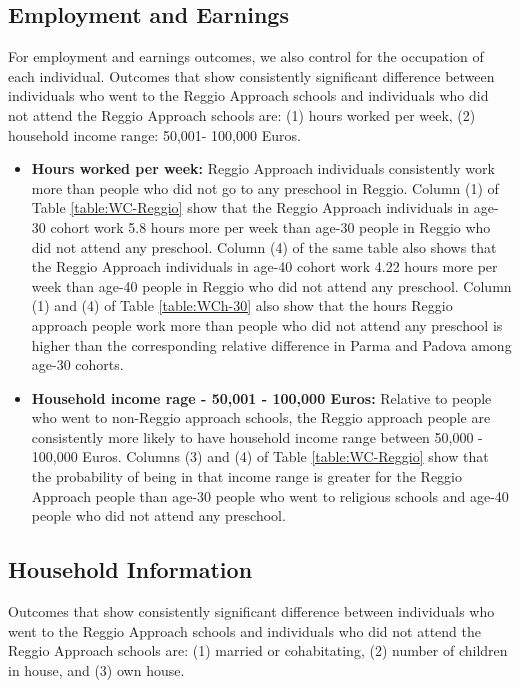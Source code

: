 \documentclass[11pt]{article}
\begin{document}
\subsection{Employment and Earnings}
For employment and earnings outcomes, we also control for the occupation of each individual. Outcomes that show consistently significant difference between individuals who went to the Reggio Approach schools and individuals who did not attend the Reggio Approach schools are: (1) hours worked per week, (2) household income range: 50,001- 100,000 Euros.

\begin{itemize}
\item \textbf{Hours worked per week:} Reggio Approach individuals consistently work more than people who did not go to any preschool in Reggio. Column (1) of Table \ref{table:WC-Reggio} show that the Reggio Approach individuals in age-30 cohort work 5.8 hours more per week than age-30 people in Reggio who did not attend any preschool. Column (4) of the same table also shows that the Reggio Approach individuals in age-40 cohort work 4.22 hours more per week than age-40 people in Reggio who did not attend any preschool. Column (1) and (4) of Table \ref{table:WCh-30} also show that the hours Reggio approach people work more than people who did not attend any preschool is higher than the corresponding relative difference in Parma and Padova among age-30 cohorts. 

\item \textbf{Household income rage - 50,001 - 100,000 Euros:} Relative to people who went to non-Reggio approach schools, the Reggio approach people are consistently more likely to have household income range between 50,000 - 100,000 Euros. Columns (3) and (4) of Table \ref{table:WC-Reggio} show that the probability of being in that income range is greater for the Reggio Approach people than age-30 people who went to religious schools and age-40 people who did not attend any preschool.  
\end{itemize}  

\subsection{Household Information}
Outcomes that show consistently significant difference between individuals who went to the Reggio Approach schools and individuals who did not attend the Reggio Approach schools are: (1) married or cohabitating, (2) number of children in house, and (3) own house.
\end{document}
